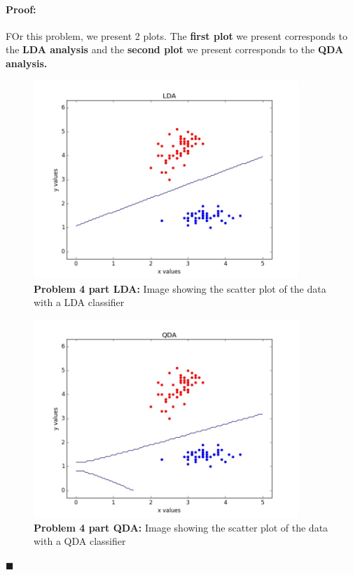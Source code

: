 \documentclass[12pt]{article}
\newenvironment{proof}{\paragraph{Proof: }}{\hfill$\blacksquare$}
\begin{document}
\begin{proof}

FOr this problem,  we present 2 plots. The \textbf{first plot} we present corresponds to the \textbf{LDA analysis} and the \textbf{second plot} we present corresponds to the\textbf{ QDA analysis.}


\begin{figure}[!htbp]
\centering
\includegraphics[width=10cm]{hw3_prob4_LDA.jpg}
\caption{\textbf{Problem 4 part LDA:} Image showing the scatter plot of the data with a LDA classifier}
\end{figure}

\begin{figure}[!htbp]
\centering
\includegraphics[width=10cm]{hw3_prob4_QDA.jpg}
\caption{\textbf{Problem 4 part QDA:} Image showing the scatter plot of the data with a QDA classifier}
\end{figure}

\end{proof}
\end{document}
